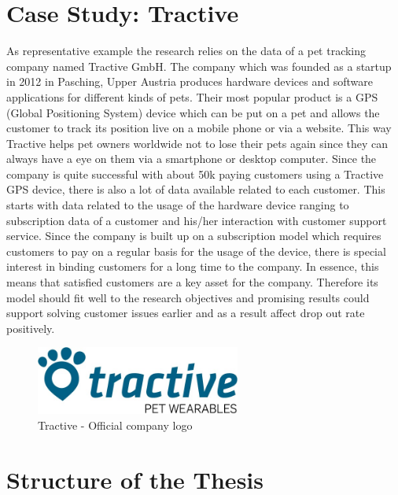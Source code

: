 \section{Case Study: Tractive}
\label{sec:illustrationExample}

As representative example the research relies on the data of a pet tracking company named Tractive GmbH. The company which was founded as a startup in 2012 in Pasching, Upper Austria produces hardware devices and software applications for different kinds of pets. Their most popular product is a GPS (Global Positioning System) device which can be put on a pet and allows the customer to track its position live on a mobile phone or via a website. This way Tractive helps pet owners worldwide not to lose their pets again since they can always have a eye on them via a smartphone or desktop computer. Since the company is quite successful with about 50k paying customers using a Tractive GPS device, there is also a lot of data available related to each customer. This starts with data related to the usage of the hardware device ranging to subscription data of a customer and his/her interaction with customer support service. Since the company is built up on a subscription model which requires customers to pay on a regular basis for the usage of the device, there is special interest in binding customers for a long time to the company. In essence, this means that satisfied customers are a key asset for the company. Therefore its model should fit well to the research objectives and promising results could support solving customer issues earlier and as a result affect drop out rate positively. 

\begin{figure}[H]
	\centering
	\includegraphics[width=0.6\textwidth]{img/tractiveLogo.jpg}%
	\caption{Tractive - Official company logo}	
\end{figure}

\section{Structure of the Thesis}


